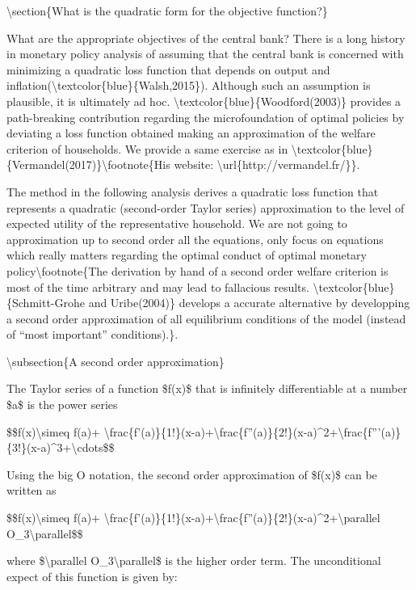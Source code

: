 \documentclass[10pt,math=newtx,citestyle=gb7714-2015,bibstyle=gb7714-2015]{elegantbook}
\begin{document}
	\textbackslash{}section\{What is the quadratic form for the objective function?\}
	
	What are the appropriate objectives of the central bank? There is a long history in monetary policy analysis of assuming that the central bank is concerned with minimizing a quadratic loss function that depends on output and inflation(\textbackslash{}textcolor\{blue\}\{Walsh,2015\}). Although such an assumption is plausible, it is ultimately ad hoc. \textbackslash{}textcolor\{blue\}\{Woodford(2003)\} provides a path-breaking contribution regarding the microfoundation of optimal policies by deviating a loss function obtained making an approximation of the welfare criterion of households. We provide a same exercise as in \textbackslash{}textcolor\{blue\}\{Vermandel(2017)\}\textbackslash{}footnote\{His website: \textbackslash{}url\{http://vermandel.fr/\}\}.
	
	The method in the following analysis derives a quadratic loss function that represents a quadratic (second-order Taylor series) approximation to the level of expected utility of the representative household. We are not going to approximation up to second order all the equations, only focus on equations which really matters regarding the optimal conduct of optimal monetary policy\textbackslash{}footnote\{The derivation by hand of a second order welfare criterion is most of the time arbitrary and may lead to fallacious results. \textbackslash{}textcolor\{blue\}\{Schmitt-Grohe and Uribe(2004)\} develops a accurate alternative by developping a second order approximation of all equilibrium conditions of the model (instead of ``most important'' conditions).\}.
	
	\textbackslash{}subsection\{A second order approximation\}
	
	The Taylor series of a function \$f(x)\$ that is infinitely differentiable at a number \$a\$ is the power series
	
	\$\$f(x)\textbackslash{}simeq f(a)+ \textbackslash{}frac\{f'(a)\}\{1!\}(x-a)+\textbackslash{}frac\{f''(a)\}\{2!\}(x-a)\^{}2+\textbackslash{}frac\{f'''(a)\}\{3!\}(x-a)\^{}3+\textbackslash{}cdots\$\$
	
	Using the big O notation, the second order approximation of \$f(x)\$ can be written as
	
	\$\$f(x)\textbackslash{}simeq f(a)+ \textbackslash{}frac\{f'(a)\}\{1!\}(x-a)+\textbackslash{}frac\{f''(a)\}\{2!\}(x-a)\^{}2+\textbackslash{}parallel O\_3\textbackslash{}parallel\$\$
	
	where \$\textbackslash{}parallel O\_3\textbackslash{}parallel\$ is the higher order term. The unconditional expect of this function is given by:
	
\end{document}
